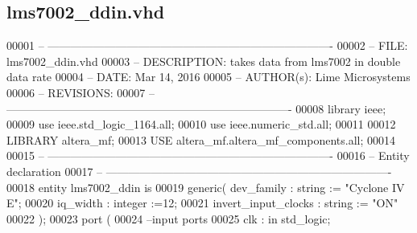 \subsection{lms7002\+\_\+ddin.\+vhd}
\label{altera__inst_2lms7002__ddin_8vhd_source}

\begin{DoxyCode}
00001 \textcolor{keyword}{-- ---------------------------------------------------------------------------- }
00002 \textcolor{keyword}{-- FILE:    lms7002\_ddin.vhd}
00003 \textcolor{keyword}{-- DESCRIPTION: takes data from lms7002 in double data rate}
00004 \textcolor{keyword}{-- DATE:    Mar 14, 2016}
00005 \textcolor{keyword}{-- AUTHOR(s):   Lime Microsystems}
00006 \textcolor{keyword}{-- REVISIONS:}
00007 \textcolor{keyword}{-- ---------------------------------------------------------------------------- }
00008 \textcolor{vhdlkeyword}{library }\textcolor{keywordflow}{ieee};
00009 \textcolor{vhdlkeyword}{use }ieee.std\_logic\_1164.\textcolor{keywordflow}{all};
00010 \textcolor{vhdlkeyword}{use }ieee.numeric\_std.\textcolor{keywordflow}{all};
00011 
00012 \textcolor{vhdlkeyword}{LIBRARY }\textcolor{keywordflow}{altera\_mf};
00013 \textcolor{vhdlkeyword}{USE }altera_mf.altera\_mf\_components.\textcolor{keywordflow}{all};
00014 
00015 \textcolor{keyword}{-- ----------------------------------------------------------------------------}
00016 \textcolor{keyword}{-- Entity declaration}
00017 \textcolor{keyword}{-- ----------------------------------------------------------------------------}
00018 \textcolor{keywordflow}{entity }lms7002_ddin \textcolor{keywordflow}{is}
00019     \textcolor{keywordflow}{generic}\textcolor{vhdlchar}{(} \textcolor{vhdlchar}{dev_family}             \textcolor{vhdlchar}{:} \textcolor{comment}{string} \textcolor{vhdlchar}{:=} \textcolor{keyword}{"Cyclone IV E"};
00020                 \textcolor{vhdlchar}{iq_width}                    \textcolor{vhdlchar}{:} \textcolor{comment}{integer} \textcolor{vhdlchar}{:=}\textcolor{vhdllogic}{}\textcolor{vhdllogic}{12};
00021                 \textcolor{vhdlchar}{invert_input_clocks} \textcolor{vhdlchar}{:} \textcolor{comment}{string} \textcolor{vhdlchar}{:=} \textcolor{keyword}{"ON"}
00022     \textcolor{vhdlchar}{)};
00023     \textcolor{keywordflow}{port} \textcolor{vhdlchar}{(}
00024 \textcolor{keyword}{      --input ports }
00025       \textcolor{vhdlchar}{clk}           \textcolor{vhdlchar}{:} \textcolor{keywordflow}{in} \textcolor{comment}{std\_logic};

\end{DoxyCode}
